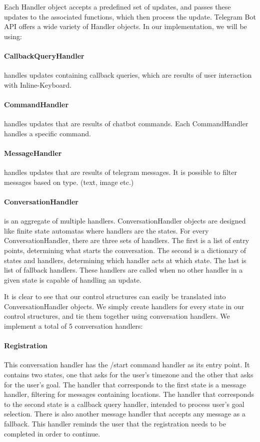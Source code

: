 Each Handler object accepts a predefined set of updates, and passes these updates to the associated functions, which then process the update.
Telegram Bot API offers a wide variety of Handler objects.
In our implementation, we will be using:

\paragraph{CallbackQueryHandler} handles updates containing callback queries, which are results of user interaction with Inline-Keyboard. 

\paragraph{CommandHandler} handles updates that are results of chatbot commands.
Each CommandHandler handles a specific command.

\paragraph{MessageHandler} handles updates that are results of telegram messages.
It is possible to filter messages based on type. (text, image etc.)

\paragraph{ConversationHandler} is an aggregate of multiple handlers. 
ConversationHandler objects are designed like finite state automatas where handlers are the states.
For every ConversationHandler, there are three sets of handlers.
The first is a list of entry points, determining what starts the conversation.
The second is a dictionary of states and handlers, determining which handler acts at which state.
The last is list of fallback handlers.
These handlers are called when no other handler in a given state is capable of handling an update.

It is clear to see that our control structures can easily be translated into ConversationHandler objects.
We simply create handlers for every state in our control structures, and tie them together using conversation handlers.
We implement a total of 5 conversation handlers:

\paragraph{Registration} This conversation handler has the /start command handler as its entry point. 
It contains two states, one that asks for the user's timezone and the other that asks for the user's goal.
The handler that corresponds to the first state is a message handler, filtering for messages containing locations.
The handler that corresponds to the second state is a callback query handler, intended to process user's goal selection.
There is also another message handler that accepts any message as a fallback.
This handler reminds the user that the registration needs to be completed in order to continue.

